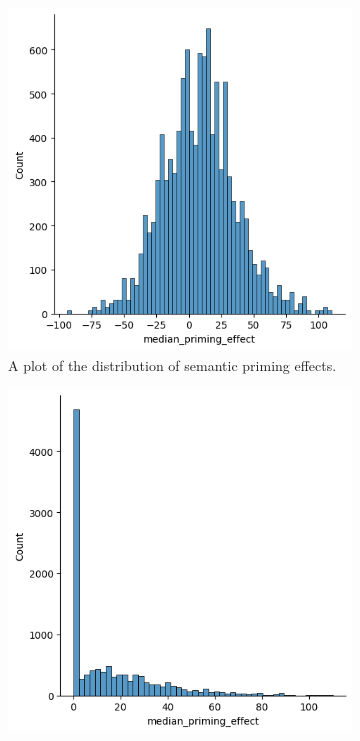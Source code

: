 \documentclass{IEEEtran}
\begin{document}
\begin{figure}
    \centering
    \begin{subfigure}{0.4\textwidth}
        \centering
        \includegraphics[width=\textwidth]{images/distribution_semantic_priming_effect_unnormalized.png}
        \caption{A plot of the distribution of semantic priming effects.}
        \label{fig:semantic_priming_unnormalized}
    \end{subfigure}
    \begin{subfigure}{0.4\textwidth}
        \centering
        \includegraphics[width=\textwidth]{images/distribution_semantic_priming_effect_normalized.png}

\end{subfigure}
\end{figure}
\end{document}
